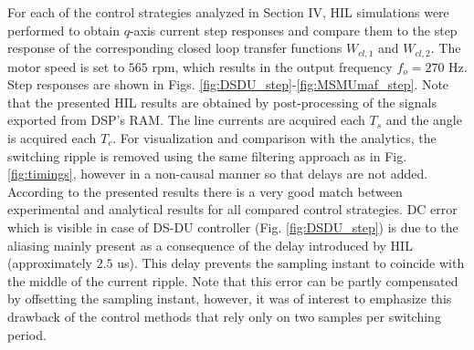 \documentclass[conference]{IEEEtran}
\begin{document}
For each of the control strategies analyzed in Section IV, HIL simulations were performed to obtain $q$-axis current step responses and compare them to the step response of the corresponding closed loop transfer functions $W_{cl,1}$ and $W_{cl,2}$. The motor speed is set to $565$ rpm, which results in the output frequency $f_o=270$ Hz. 
Step responses are shown in Figs. \ref{fig:DSDU_step}-\ref{fig:MSMUmaf_step}. Note that the presented HIL results are obtained by post-processing of the signals exported from DSP’s RAM. The line currents are acquired each $T_s$ and the angle is acquired each $T_c$. 
For visualization and comparison with the analytics, the switching ripple is removed using the same filtering approach as in Fig. \ref{fig:timings}, however in a non-causal manner so that delays are not added.
According to the presented results there is a very good match between experimental and analytical results for all compared control strategies. DC error which is visible in case of DS-DU controller (Fig. \ref{fig:DSDU_step}) is due to the aliasing mainly present as a consequence of the delay introduced by HIL (approximately $2.5$ us). This delay prevents the sampling instant to coincide with the middle of the current ripple. Note that this error can be partly compensated by offsetting the sampling instant, however, it was of interest to emphasize this drawback of the control methods that rely only on two samples per switching period. 
\end{document}

